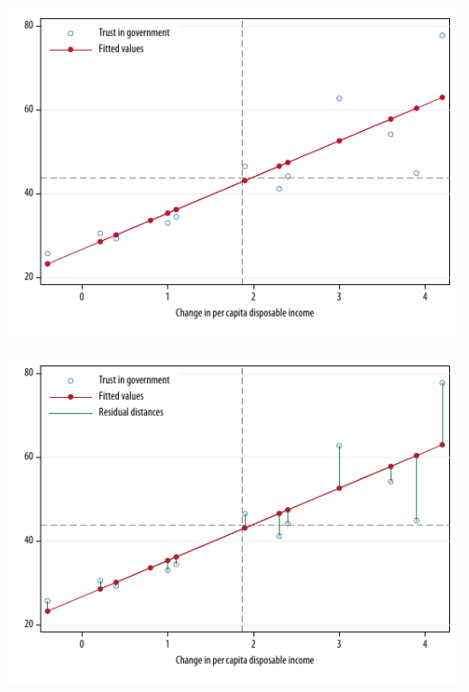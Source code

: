 \documentclass[t]{beamer}
\begin{document}
	\begin{frame}[c] %
			
		\begin{center}
			\includegraphics[width=\textwidth]{trust-linear-fit-2}
		\end{center}
				
	\end{frame}

	\begin{frame}[c] %
			
		\begin{center}
			\includegraphics[width=\textwidth]{trust-linear-fit-3}
		\end{center}
				
	\end{frame}
	
\end{document}
